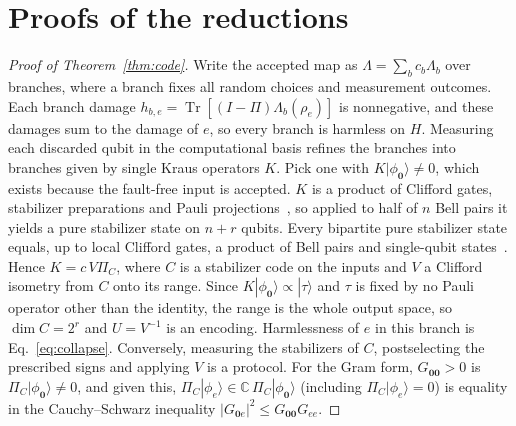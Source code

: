 \documentclass[aps,prl,reprint,twocolumn,amsmath,amssymb,floatfix,nofootinbib,superscriptaddress]{revtex4-2}
\newcommand{\tr}{\operatorname{Tr}}
\begin{document}
\section{Proofs of the reductions}\label{app:proofs}
\begin{proof}[Proof of Theorem~\ref{thm:code}]
Write the accepted map as $\Lambda=\sum_bc_b\Lambda_b$ over branches, where a branch fixes all random choices and measurement outcomes. Each branch damage $h_{b,e}=\tr[(I-\Pi)\Lambda_b(\rho_e)]$ is nonnegative, and these damages sum to the damage of $e$, so every branch is harmless on $H$. Measuring each discarded qubit in the computational basis refines the branches into branches given by single Kraus operators $K$. Pick one with $K|\phi_{\mathbf0}\rangle\neq0$, which exists because the fault-free input is accepted. $K$ is a product of Clifford gates, stabilizer preparations and Pauli projections~\cite{campbellbrowne}, so applied to half of $n$ Bell pairs it yields a pure stabilizer state on $n+r$ qubits. Every bipartite pure stabilizer state equals, up to local Clifford gates, a product of Bell pairs and single-qubit states~\cite{fattal}. Hence $K=c\,V\Pi_C$, where $C$ is a stabilizer code on the inputs and $V$ a Clifford isometry from $C$ onto its range. Since $K|\phi_{\mathbf0}\rangle\propto|\tau\rangle$ and $\tau$ is fixed by no Pauli operator other than the identity, the range is the whole output space, so $\dim C=2^r$ and $U=V^{-1}$ is an encoding. Harmlessness of $e$ in this branch is Eq.~\eqref{eq:collapse}. Conversely, measuring the stabilizers of $C$, postselecting the prescribed signs and applying $V$ is a protocol. For the Gram form, $G_{\mathbf0\mathbf0}>0$ is $\Pi_C|\phi_{\mathbf0}\rangle\neq0$, and given this, $\Pi_C|\phi_e\rangle\in\mathbb C\,\Pi_C|\phi_{\mathbf0}\rangle$ (including $\Pi_C|\phi_e\rangle=0$) is equality in the Cauchy--Schwarz inequality $|G_{\mathbf0e}|^2\leq G_{\mathbf0\mathbf0}G_{ee}$.
\end{proof}
\end{document}
